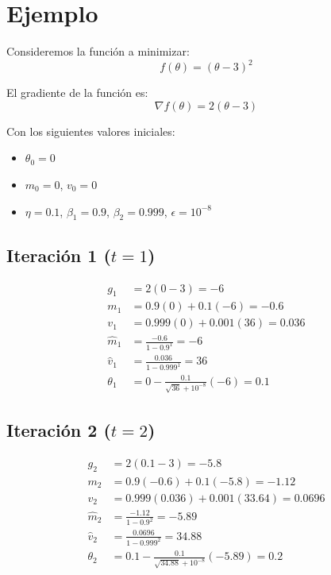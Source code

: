 \documentclass[a5paper]{article}
\begin{document}
	\section*{Ejemplo}
	Consideremos la función a minimizar:
	\begin{equation}
		f(\theta) = (\theta - 3)^2
	\end{equation}
	
	El gradiente de la función es:
	\begin{equation}
		\nabla f(\theta) = 2(\theta - 3)
	\end{equation}
	
	Con los siguientes valores iniciales:
	\begin{itemize}
		\item $\theta_0 = 0$
		\item $m_0 = 0$, $v_0 = 0$
		\item $\eta = 0.1$, $\beta_1 = 0.9$, $\beta_2 = 0.999$, $\epsilon = 10^{-8}$
	\end{itemize}
	
	\subsection*{Iteración 1 ($t=1$)}
	\begin{align*}
		g_1 &= 2(0 - 3) = -6 \\
		m_1 &= 0.9(0) + 0.1(-6) = -0.6 \\
		v_1 &= 0.999(0) + 0.001(36) = 0.036 \\
		\hat{m}_1 &= \frac{-0.6}{1 - 0.9^1} = -6 \\
		\hat{v}_1 &= \frac{0.036}{1 - 0.999^1} = 36 \\
		\theta_1 &= 0 - \frac{0.1}{\sqrt{36} + 10^{-8}} (-6) = 0.1
	\end{align*}
	
	\subsection*{Iteración 2 ($t=2$)}
	\begin{align*}
		g_2 &= 2(0.1 - 3) = -5.8 \\
		m_2 &= 0.9(-0.6) + 0.1(-5.8) = -1.12 \\
		v_2 &= 0.999(0.036) + 0.001(33.64) = 0.0696 \\
		\hat{m}_2 &= \frac{-1.12}{1 - 0.9^2} = -5.89 \\
		\hat{v}_2 &= \frac{0.0696}{1 - 0.999^2} = 34.88 \\
		\theta_2 &= 0.1 - \frac{0.1}{\sqrt{34.88} + 10^{-8}} (-5.89) = 0.2
	\end{align*}
	
\end{document}
